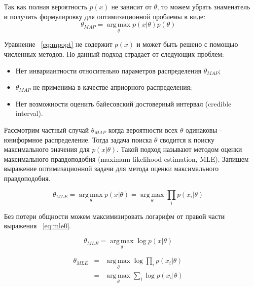 Так как полная вероятность $p \left(  x \right)$ не зависит от $\theta$, то можем убрать знаменатель и получить формулировку для оптимизационной проблемы в виде:
\begin{equation} \label{eq:mpopt}
\theta_{MAP} = \operatorname*{arg\,max}_\theta p \left( x \vert \theta \right) p \left( \theta \right)
\end{equation}

Уравнение ~\ref{eq:mpopt} не содержит $p \left(  x \right)$ и может быть решено с помощью численных методов. Но данный подход страдает от следующих проблем: 
\begin{itemize}
	\item Нет инвариантности относительно параметров распределения $\theta_{MAP}$;
	\item $\theta_{MAP}$ не применима в качестве априорного распределения;
	\item Нет возможности оценить байесовский достоверный интервал (credible interval).
\end{itemize}

Рассмотрим частный случай $\theta_{MAP}$ когда вероятности всех $\theta$ одинаковы - юниформное распределение. 
Тогда задача поиска $\theta$ сводится к поиску максимального значения для $p \left( x \vert \theta \right)$. 
Такой подход называют методом оценки максимального правдоподобия (maximum likelihood estimation, MLE).
Запишем выражение оптимизационной задачи для метода оценки максимального правдоподобия.

\begin{equation} \label{eq:mle0}
\theta_{MLE} = \operatorname*{arg\,max}_\theta p \left( x \vert \theta \right) = \operatorname*{arg\,max}_\theta \prod_i p \left( x_i \vert \theta \right)
\end{equation}

Без потери общности можем максимизировать логарифм от правой части выражения ~\ref{eq:mle0}.

\begin{equation} \label{eq:mle1}
\theta_{MLE} = \operatorname*{arg\,max}_\theta \log p \left(  x \vert \theta \right) 
\end{equation}

\begin{eqnarray*} \label{eq:mle2}
\theta_{MLE} & = & \operatorname*{arg\,max}_\theta \log \prod_i p \left( x_i \vert \theta \right) \\
             & = & \operatorname*{arg\,max}_\theta \sum_i \log p \left( x_i \vert \theta \right)
\end{eqnarray*}

